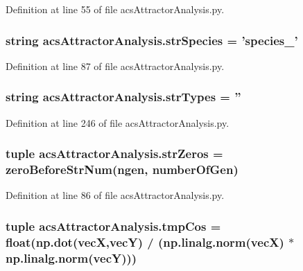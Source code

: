 Definition at line 55 of file acs\-Attractor\-Analysis.\-py.

\hypertarget{a00091_aa76707ba3058ba96fc8e5aeafa461193}{
\subsubsection[{str\-Species}]{\setlength{\rightskip}{0pt plus 5cm}string acs\-Attractor\-Analysis.\-str\-Species = 'species\-\_\-'}}\label{a00091_aa76707ba3058ba96fc8e5aeafa461193}


Definition at line 87 of file acs\-Attractor\-Analysis.\-py.

\hypertarget{a00091_ae5f324ca114055fca79473eecd17bb80}{
\subsubsection[{str\-Types}]{\setlength{\rightskip}{0pt plus 5cm}string acs\-Attractor\-Analysis.\-str\-Types = ''}}\label{a00091_ae5f324ca114055fca79473eecd17bb80}


Definition at line 246 of file acs\-Attractor\-Analysis.\-py.

\hypertarget{a00091_a5708d1d44920d75a918ec1c988c02c57}{
\subsubsection[{str\-Zeros}]{\setlength{\rightskip}{0pt plus 5cm}tuple acs\-Attractor\-Analysis.\-str\-Zeros = {\bf zero\-Before\-Str\-Num}(ngen, {\bf number\-Of\-Gen})}}\label{a00091_a5708d1d44920d75a918ec1c988c02c57}


Definition at line 86 of file acs\-Attractor\-Analysis.\-py.

\hypertarget{a00091_a305669433b259c5ffcb797769e7c30df}{
\subsubsection[{tmp\-Cos}]{\setlength{\rightskip}{0pt plus 5cm}tuple acs\-Attractor\-Analysis.\-tmp\-Cos = float(np.\-dot({\bf vec\-X},{\bf vec\-Y}) / (np.\-linalg.\-norm({\bf vec\-X}) $\ast$ np.\-linalg.\-norm({\bf vec\-Y})))}}\label{a00091_a305669433b259c5ffcb797769e7c30df}


